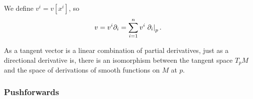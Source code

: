 \documentclass[a4paper,12pt]{article}
\begin{document}
We define $v^i = v[x^i]$, so 
\begin{equation}
    v = v^i \partial_i = \sum_{i=1}^n v^i \eval{\partial_i}{p}.
\end{equation}
\begin{remark}
    As a tangent vector is a linear combination of partial derivatives, just as a directional derivative is, there is an isomorphism between the tangent space $T_p M$ and the space of derivations of smooth functions on $M$ at $p$.
\end{remark}

\subsubsection{Pushforwards}\label{subsubsec:manifolds:tangent_spaces:pushforwards}
\end{document}
